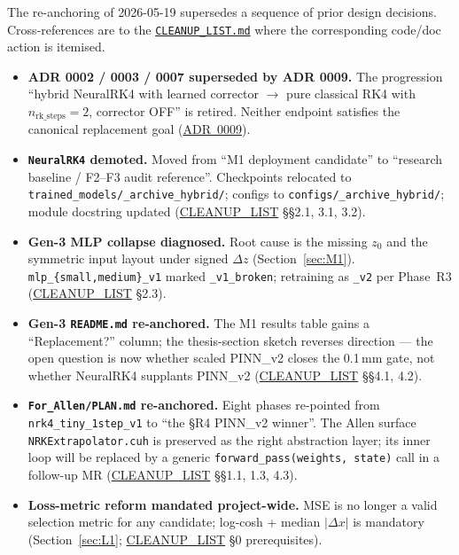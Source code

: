 \documentclass[11pt,a4paper]{article}
\newcommand{\dz}{\Delta z}
\begin{document}
The re-anchoring of 2026-05-19 supersedes a sequence of prior design
decisions. Cross-references are to the
\href{run:../../experiments/gen_3/CLEANUP_LIST.md}{\texttt{CLEANUP\_LIST.md}}
where the corresponding code/doc action is itemised.
\begin{itemize}
\item \textbf{ADR 0002 / 0003 / 0007 superseded by ADR 0009.} The progression
``hybrid NeuralRK4 with learned corrector $\to$ pure classical RK4 with
$n_\mathrm{rk\_steps}=2$, corrector OFF'' is retired. Neither endpoint
satisfies the canonical replacement goal
(\href{run:../../experiments/gen_3/For_Allen/docs/decisions/0009-replacement-goal-restated.md}{ADR~0009}).
\item \textbf{\texttt{NeuralRK4} demoted.} Moved from ``M1 deployment
candidate'' to ``research baseline / F2--F3 audit reference''. Checkpoints
relocated to \texttt{trained\_models/\_archive\_hybrid/}; configs to
\texttt{configs/\_archive\_hybrid/}; module docstring updated
(\href{run:../../experiments/gen_3/CLEANUP_LIST.md}{CLEANUP\_LIST} §§2.1, 3.1, 3.2).
\item \textbf{Gen-3 MLP collapse diagnosed.} Root cause is the missing
$z_0$ and the symmetric input layout under signed $\dz$
(Section~\ref{sec:M1}). \texttt{mlp\_\{small,medium\}\_v1} marked
\texttt{\_v1\_broken}; retraining as \texttt{\_v2} per Phase~R3
(\href{run:../../experiments/gen_3/CLEANUP_LIST.md}{CLEANUP\_LIST} §2.3).
\item \textbf{Gen-3 \texttt{README.md} re-anchored.} The M1 results table
gains a ``Replacement?'' column; the thesis-section sketch reverses
direction --- the open question is now whether scaled PINN\_v2 closes the
0.1\,mm gate, not whether NeuralRK4 supplants PINN\_v2
(\href{run:../../experiments/gen_3/CLEANUP_LIST.md}{CLEANUP\_LIST} §§4.1, 4.2).
\item \textbf{\texttt{For\_Allen/PLAN.md} re-anchored.} Eight phases
re-pointed from \texttt{nrk4\_tiny\_1step\_v1} to ``the §R4 PINN\_v2
winner''. The Allen surface \texttt{NRKExtrapolator.cuh} is preserved as
the right abstraction layer; its inner loop will be replaced by a generic
\texttt{forward\_pass(weights, state)} call in a follow-up MR
(\href{run:../../experiments/gen_3/CLEANUP_LIST.md}{CLEANUP\_LIST} §§1.1, 1.3, 4.3).
\item \textbf{Loss-metric reform mandated project-wide.} MSE is no longer
a valid selection metric for any candidate; log-cosh + median $|\Delta x|$
is mandatory (Section~\ref{sec:L1};
\href{run:../../experiments/gen_3/CLEANUP_LIST.md}{CLEANUP\_LIST} §0 prerequisites).
\end{itemize}
\end{document}
